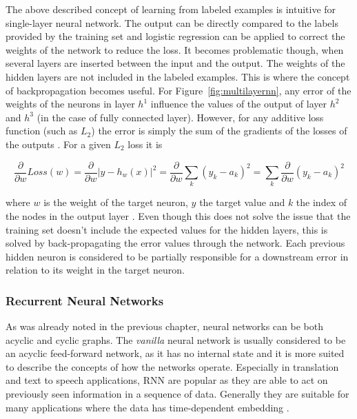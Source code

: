 The above described concept of learning from labeled examples is intuitive for single-layer neural network. The output can be
directly compared to the labels provided by the training set and logistic regression can be applied to correct the weights of
the network to reduce the loss. It becomes problematic though, when several layers are inserted between the input and
the output. The weights of the hidden layers are not included in the labeled examples. This is where the concept of
backpropagation becomes useful. For Figure~\ref{fig:multilayernn}, any error of the weights of the neurons in
layer $h^1$ influence the values of the output of layer $h^2$ and $h^3$ (in the case of fully connected layer).
However, for any additive loss function (such as $L_2$) the error is simply the sum of the gradients of the losses of
the outputs \cite[p.733f.]{russell2016artificial}. For a given $L_2$ loss it is

\begin{equation}
    \frac{\partial}{\partial w} Loss(w) =  \frac{\partial}{\partial w} \vert y-h_w(x) \vert ^2 = \frac{\partial}{\partial w} \sum_k{(y_k - a_k)^2} =  \sum_k{\frac{\partial}{\partial w}(y_k - a_k)^2}
    \label{equ:errorssum}
\end{equation}

\noindent where $w$ is the weight of the target neuron, $y$ the target value and $k$ the index of the nodes in the
output layer \cite[p.733f.]{russell2016artificial}. Even though this does not
solve the issue that the training set doesn't include the expected values for the hidden layers, this is solved by
back-propagating the error values through the network. Each previous hidden neuron is considered to be partially
responsible for a downstream error in relation to its weight in the target neuron.

\subsubsection{Recurrent Neural Networks}%
\label{sec:recurrent_neural_networks}

As was already noted in the previous chapter, neural networks can be both acyclic and cyclic graphs. The
\emph{vanilla} neural network is usually considered to be an acyclic feed-forward network, as it has no internal state
and it is more suited to describe the concepts of how the networks operate. Especially in translation and text to speech
applications, \ac{RNN} are popular as they are able to act on previously seen information in a sequence of
data. Generally they are suitable for many applications where the data has time-dependent embedding
\cite[p.373]{Goodfellow-et-al-2016}.

